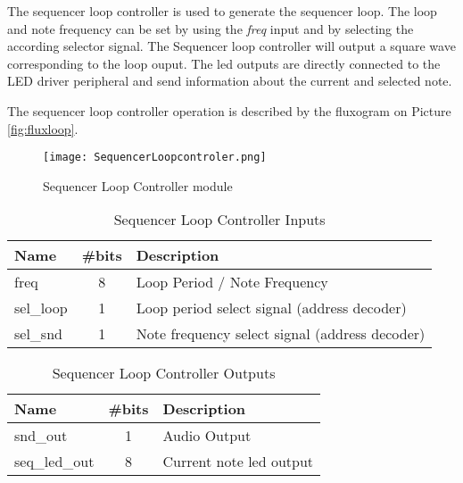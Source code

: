 \noindent The sequencer loop controller is used to generate the sequencer loop. The loop and note frequency can be set by using the \textit{freq} input and by selecting the according selector signal.
The Sequencer loop controller will output a square wave corresponding to the loop ouput. The led outputs are directly connected to the LED driver peripheral and send information about the current and selected note. 

\noindent The sequencer loop controller operation is described by the fluxogram on Picture \ref{fig:fluxloop}.


\begin{figure}[!htbp]
    \centerline{\texttt{[image: SequencerLoopcontroler.png]}}
    \vspace{0cm}\caption{Sequencer Loop Controller module}
    \label{fig:periphs}
\end{figure}

\begin{table}[!htbp]
    \centering
    \caption{Sequencer Loop Controller Inputs}
    \label{tab:slcIn}
    \begin{tabular}{@{}lcl@{}}
    \toprule
    Name      & \multicolumn{1}{l}{\#bits} & Description                                    \\ \midrule
    freq & 8                          & Loop Period / Note Frequency                                    \\
    sel\_loop & 1                          & Loop period select signal (address decoder)    \\
    sel\_snd  & 1                          & Note frequency select signal (address decoder) \\ \bottomrule
    \end{tabular}
    \end{table}

\begin{table}[!htbp]
    \centering
    \caption{Sequencer Loop Controller Outputs}
    \label{tab:slcOut}
    \begin{tabular}{@{}lcl@{}}
    \toprule
    Name          & \multicolumn{1}{l}{\#bits} & Description             \\ \midrule
    snd\_out      & 1                          & Audio Output            \\
    seq\_led\_out & 8                          & Current note led output \\ \bottomrule
    \end{tabular}
    \end{table}

